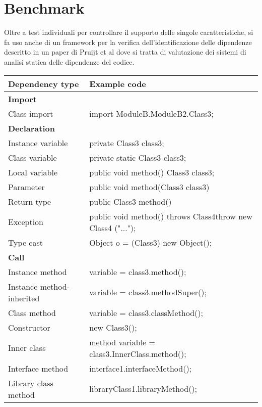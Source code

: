 \section{Benchmark}

Oltre a test individuali per controllare il supporto delle singole caratteristiche, si fa uso anche di un framework per la verifica dell'identificazione delle dipendenze descritto in un paper di Pruijt et al \cite{DBLP:journals/spe/PruijtKWB17} dove si tratta di valutazione dei sistemi di analisi statica delle dipendenze del codice.

\begin{center}
    \begin{tabular}{|l l|}
        \hline
        Dependency type & Example code \\
        \hline
        \textbf{Import} &  \\
        Class import & import ModuleB.ModuleB2.Class3; \\
        \hline
        \textbf{Declaration} &  \\
        Instance variable & private Class3 class3; \\
        Class variable & private static Class3 class3; \\
        Local variable & public void method() {Class3 class3; } \\
        Parameter & public void method(Class3 class3) {} \\
        Return type & public Class3 method() {} \\
        Exception & public void method() throws Class4{throw new Class4 ("..."); } \\
        Type cast & Object o = (Class3) new Object(); \\
        \hline
        \textbf{Call} &  \\
        Instance method & variable = class3.method(); \\
        Instance method-inherited & variable = class3.methodSuper(); \\
        Class method & variable = class3.classMethod(); \\
        Constructor & new Class3(); \\
        Inner class & method variable = class3.InnerClass.method(); \\
        Interface method & interface1.interfaceMethod(); \\
        Library class method & libraryClass1.libraryMethod(); \\

\end{tabular}
\end{center}
